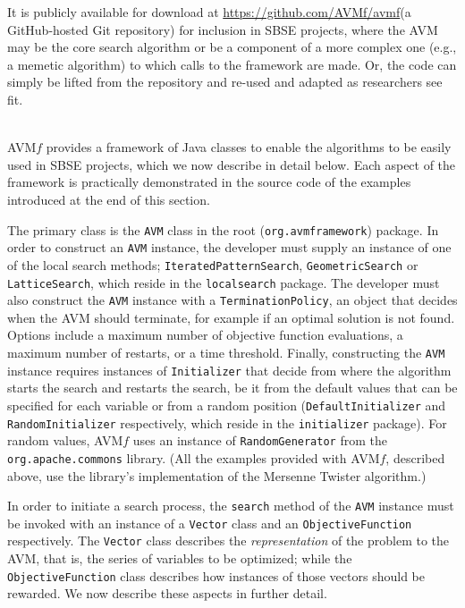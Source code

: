 \documentclass{llncs}
\newcommand{\name}{AVM\hspace{-1pt}$f$\xspace}
\newcommand{\repourl}{\url{https://github.com/AVMf/avmf}\xspace}
\newcommand{\inlineheading}[1]{\vspace{1ex} \noindent {\bf #1.}}
\begin{document}
It is publicly available for download at \repourl (a GitHub-hosted Git repository) for inclusion in SBSE projects, where the AVM may be the core search algorithm or be a component of a more complex one (e.g., a memetic algorithm) to which calls to the framework are made. Or, the code can simply be lifted from the repository and re-used and adapted as researchers see fit.

~\\
\name provides a framework of Java classes to enable the algorithms to be easily used in SBSE projects, which we now describe in detail below. Each aspect of the framework is practically demonstrated in the source code of the examples introduced at the end of this section.

\begin{sloppypar}
\inlineheading{Configuring an AVM search} The primary class is the {\tt AVM} class in the root ({\tt org.avmframework}) package. In order to construct an {\tt AVM} instance, the developer must supply an instance of one of the local search methods; {\tt IteratedPatternSearch}, {\tt GeometricSearch} or {\tt LatticeSearch}, which reside in the {\tt localsearch} package. The developer must also construct the {\tt AVM} instance with a {\tt TerminationPolicy}, an object that decides when the AVM should terminate, for example if an optimal solution is not found. Options include a maximum number of objective function evaluations, a maximum number of restarts, or a time threshold. Finally, constructing the {\tt AVM} instance requires instances of {\tt Initializer} that decide from where the algorithm starts the search and restarts the search, be it from the default values that can be specified for each variable or from a random position ({\tt DefaultInitializer} and {\tt RandomInitializer} respectively, which reside in the {\tt initializer} package). For random values, \name uses an instance of {\tt RandomGenerator} from the {\tt org.apache.commons} library. (All the examples provided with \name, described above, use the library's implementation of the Mersenne Twister algorithm.)
\end{sloppypar}

\begin{sloppypar}
In order to initiate a search process, the {\tt search} method of the {\tt AVM} instance must be invoked with an instance of a {\tt Vector} class and an {\tt ObjectiveFunction} respectively. The {\tt Vector} class describes the {\it representation} of the problem to the AVM, that is, the series of variables to be optimized; while the {\tt ObjectiveFunction} class describes how instances of those vectors should be rewarded. We now describe these aspects in further detail.
\end{sloppypar}
\end{document}
